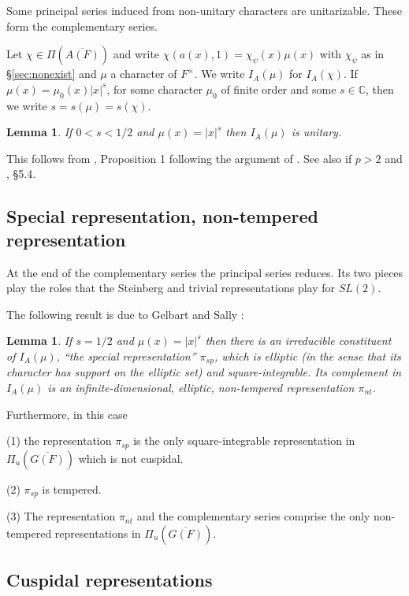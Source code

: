 \documentclass[12pt,letterpaper,openany]{book}
\theoremstyle{plain}
\newtheorem{lemma}[theorem]{Lemma}
\theoremstyle{definition}
\theoremstyle{remark}
\theoremstyle{remark}
\begin{document}
Some principal series induced from non-unitary characters are unitarizable. These form the complementary series.


Let $\chi\in\Pi(\overline{A(F)})$ and write
$\chi(a(x),1)=\chi_\psi(x)\mu(x)$ with $\chi_\psi$ as in
\S\ref{sec:nonexist} and $\mu$ a character of $F^\times$. We write
$I_A(\mu)$ for $I_A(\chi)$. If $\mu (x)=\mu _0(x)|x|^s$, for some
character $\mu _0$ of finite order and some $s\in {\mathbb C}$, then
we write $s=s(\mu )=s(\chi )$.

\begin{lemma} If $0<s<1/2$ and $\mu (x)=|x|^s$ then $I_A(\mu )$ is unitary.
\end{lemma}

This follows from \cite{GS}, Proposition 1 following
the argument of \cite{Ar}. See also
\cite{Mo1} if $p>2$ and \cite{Ge1}, \S 5.4.

\subsection{Special representation, non-tempered representation}

At the end of the complementary series the principal series reduces. Its two pieces play the roles that the Steinberg and trivial representations play for $SL(2)$.


The following result is due to Gelbart and Sally \cite{GS}:

\begin{lemma}
If $s=1/2$ and $\mu (x)=|x|^s$ then there is an irreducible
constituent of $I_A(\mu)$, ``the special
representation'' $\pi _{sp}$, which is elliptic (in the sense that its
character has support on the elliptic set) and square-integrable.
Its complement in $I_A(\mu)$ is an infinite-dimensional,
elliptic, non-tempered representation $\pi _{nt}$.
\end{lemma}

Furthermore, in this case

(1) the representation $\pi _{sp}$ is the only square-integrable
representation in $\Pi _u(\overline{G(F)})$ which is not cuspidal.

(2) $\pi _{sp}$ is tempered.

(3) The representation $\pi _{nt}$ and the complementary series comprise the
only non-tempered representations in $\Pi _u(\overline{G(F)})$.

\subsection{Cuspidal representations}
\end{document}

